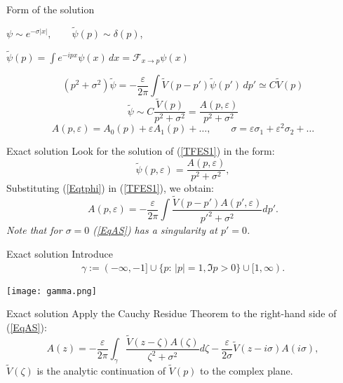 \documentclass{beamer}
\begin{document}
\begin{frame}{Form of the solution}
\centerline{$\psi\sim e^{-\sigma|x|},\qquad \tilde\psi(p)\sim\delta(p)$,}
\centerline{$\tilde\psi(p)=\int e^{-ipx}\psi(x)\,dx=\mathcal{F}_{x\to p}\psi(x)$}
$$(p^2+\sigma^2)\tilde\psi=-\frac\varepsilon{2\pi}\int\tilde V(p-p')\tilde\psi(p')\,dp'\simeq C\tilde V(p)$$
$$\tilde\psi\sim C \frac{\tilde V(p)}{p^2+\sigma^2}=\frac{A(p,\varepsilon)}{p^2+\sigma^2}$$
$$A(p,\varepsilon)=A_0(p)+\varepsilon A_1(p)+\dots,\qquad \sigma=\varepsilon\sigma_1+\varepsilon^2\sigma_2+\dots$$
\end{frame}

\begin{frame}{Exact solution}
Look for the solution of (\ref{TFES1}) in the form:
\begin{equation}\label{Eqtphi}
\tilde{\psi}(p,\varepsilon)=\frac{A(p,\varepsilon)}{p^2+\sigma^2},
\end{equation}
Substituting (\ref{Eqtphi}) in (\ref{TFES1}), we obtain:
\begin{equation}\label{EqAS}
A(p,\varepsilon)=-\frac{\varepsilon}{2\pi}\int \frac{\tilde{V}(p-p')A(p',\varepsilon)}{p'^2+\sigma^2}dp'.
\end{equation}
\emph{Note that for $\sigma=0$ (\ref{EqAS}) has a singularity at $p'=0$.}
\end{frame}


\begin{frame}{Exact solution}
Introduce
\begin{align}\label{ECG}\gamma:=(-\infty,-1] \cup \{p:\,|p|=1, \Im p>0\} \cup[1,\infty).\end{align}

\centerline{\texttt{[image: gamma.png]}}

\end{frame}

\begin{frame}{Exact solution}
Apply the Cauchy Residue Theorem  to the right-hand side of (\ref{EqAS}):
\begin{equation}\label{EqAS1}
A(z)=-\frac{\varepsilon}{2\pi}\int_\gamma \frac{\tilde{V}(z-\zeta)A(\zeta)}{\zeta^2+\sigma^2}d\zeta-\frac{\varepsilon}{2\sigma} \tilde{V}(z-i\sigma)A(i\sigma),
\end{equation}
$\tilde{V}(\zeta)$ is the analytic continuation of $\tilde{V}(p)$ to the complex plane.
\end{frame}
\end{document}
